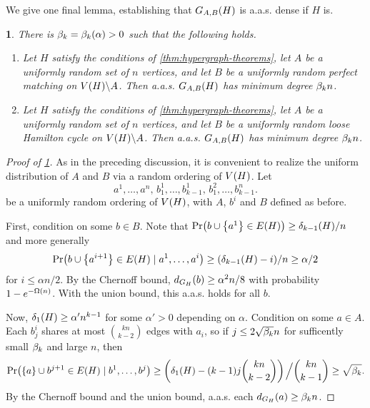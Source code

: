 \documentclass[11pt,english]{article}
\theoremstyle{plain}
\theoremstyle{definition}
\theoremstyle{definition}
\theoremstyle{plain}
\theoremstyle{plain}
\theoremstyle{plain}
\newtheorem{lem}[thm]{\protect\lemmaname}
\theoremstyle{plain}
\theoremstyle{remark}
\theoremstyle{remark}
\let\originalleft\left
\let\originalright\right
\renewcommand{\left}{\mathopen{}\mathclose\bgroup\originalleft}
\renewcommand{\right}{\aftergroup\egroup\originalright}
\providecommand{\lemmaname}{Lemma}
\begin{document}
We give one final lemma, establishing that $G_{A,B}\left(H\right)$ is a.a.s. dense if $H$ is.
\begin{lem}
\label{lem:hypergraph-bipartite-degree-transfer}There is $\a=\a\left(\alpha\right)>0$ such that the following
holds.

\begin{enumerate}[topsep=0px,label=(\alph*)]

\item{\label{itm:hypergraph-bipartite-matching-degree-transfer}Let $H$ satisfy the conditions of \ref{thm:hypergraph-theorems},
let $A$ be a uniformly random set of $n$ vertices, and let $B$
be a uniformly random perfect matching on $V\left(H\right)\backslash A$.
Then a.a.s. $G_{A,B}\left(H\right)$ has minimum degree $\beta_k n$.}

\item{\label{itm:hypergraph-bipartite-cycle-degree-transfer}Let $H$ satisfy the conditions of \ref{thm:hypergraph-theorems},
let $A$ be a uniformly random set of $n$ vertices, and let $B$
be a uniformly random loose Hamilton cycle on $V\left(H\right)\backslash A$.
Then a.a.s. $G_{A,B}\left(H\right)$ has minimum degree $\beta_k n$.}

\end{enumerate}\end{lem}
\begin{proof}
[Proof of \ref{lem:hypergraph-bipartite-degree-transfer}]As in the preceding discussion, it is convenient to realize the uniform
distribution of $A$ and $B$ via a random ordering of $V\left(H\right)$.
Let 
\[
a^{1},\dots,a^{n},\, b_{1}^{1},\dots,b_{k-1}^{1},\, b_{1}^{2},\dots,b_{k-1}^{n}.
\]
be a uniformly random ordering of $V\left(H\right)$, with $A$, $b^i$ and
$B$ defined as before.

First, condition on some $b\in B$. Note that $\Pr\left(b\cup\left\{ a^{1}\right\} \in E\left(H\right)\right)\ge\delta_{k-1}\left(H\right)/n$
and more generally 
\[
\Pr\left(b\cup\left\{ a^{i+1}\right\} \in E\left(H\right)\mid a^{1},\dots,a^{i}\right)\ge\left(\delta_{k-1}\left(H\right)-i\right)/n\ge\alpha/2
\]
for $i\le\alpha n/2$. By the Chernoff bound, $d_{G_{H}}\left(b\right)\ge\alpha^{2}n/8$
with probability $1-e^{-\Omega\left(n\right)}$. With the union bound,
this a.a.s. holds for all $b$.

Now, $\delta_{1}\left(H\right)\ge\alpha'n^{k-1}$ for some $\alpha'>0$
depending on $\alpha$. Condition on some $a\in A$. Each $b_{j}^{i}$
shares at most ${kn \choose k-2}$ edges with $a_{i}$, so if $j\le2\sqrt{\beta_k}n$
for sufficently small $\beta_k$ and large $n$,
then
\[
\Pr\left(\left\{ a\right\} \cup b^{j+1}\in E\left(H\right)\mid b^{1},\dots,b^{j}\right)\ge\left(\delta_{1}\left(H\right)-\left(k-1\right)j{kn \choose k-2}\right)\left.\vphantom{\sum}\right/{kn \choose k-1}\ge\sqrt{\amat}.
\]
By the Chernoff bound and the union bound, a.a.s. each $d_{G_{H}}\left(a\right)\ge\amat n$.
\end{proof}
\end{document}
